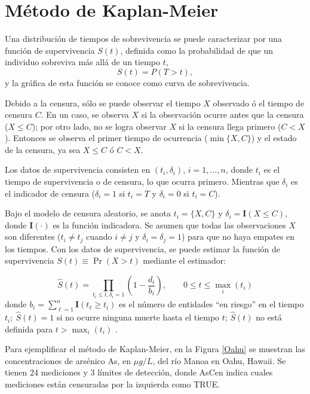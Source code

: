\chapter*{Método de Kaplan-Meier}

Una distribución de tiempos de sobrevivencia se puede caracterizar por una función de supervivencia $S(t)$, definida como la probabilidad de que un individuo sobreviva más allá de un tiempo $t$,
\begin{equation}
    S(t)=P(T >t),
    \label{funcion_supervivencia}
\end{equation}
y la gráfica de esta función se conoce como curva de sobrevivencia. 

Debido a la censura, sólo se puede observar el tiempo $X$ observado ó el tiempo de censura $C$. En un caso, se observa $X$ si la observación ocurre antes que la censura ($X\leq C$); por otro lado, no se logra observar $X$ si la censura llega primero ($C < X$). Entonces se observa el primer tiempo de ocurrencia ($\min \{X, C\}$) y el estado de la censura, ya sea $X\leq C$ ó $C < X$. 

Los datos de supervivencia consisten en $(t_i,\delta_i)$, $i=1,...,n$, donde $t_i$ es el tiempo de supervivencia o de censura, lo que ocurra primero. Mientras que $\delta_i$ es el indicador de censura ($\delta_i=1$ si $t_i=T$ y $\delta_i=0$ si $t_i=C$).

Bajo el modelo de censura aleatorio, se anota $t_i=\{X, C \}$ y $\delta_i=\textbf{I}(X\leq C)$, donde $\textbf{I}(\cdot)$ es la función indicadora. Se asumen que todas las observaciones $X$ son diferentes ($t_i\neq t_j$ cuando $i\neq j$ y $\delta_i=\delta_j=1$) para que no haya empates en los tiempos. Con los datos de supervivencia, se puede estimar la función de supervivencia $S(t)\equiv \Pr (X > t)$ mediante el estimador:

\begin{equation}\label{survival}
\hat{S}(t)=\prod_{t_i\leq t,\delta_i=1}\left( 1- \frac{d_i}{b_i} \right), \qquad 0 \leq t \leq \max_{i} (t_i)     
\end{equation}
donde $b_i=\sum_{\ell = 1}^{n}\textbf{I}(t_{\ell} \geq t_i)$ es el número de entidades “en riesgo'' en el tiempo $t_i; ~\hat{S}(t)=1$ si no ocurre ninguna muerte hasta el tiempo $t$; $\hat{S}(t)$ no está definida para $t > \max_i(t_i)$ \cite[p. 10]{Emura_survival}.

Para ejemplificar el método de Kaplan-Meier, en la Figura \ref{Oahu} se muestran las concentraciones de arsénico As, en $\mu g/L$, del río Manoa en Oahu, Hawaii. Se tienen 24 mediciones y 3 límites de detección, donde AsCen indica cuales mediciones están censuradas por la izquierda como TRUE. 


